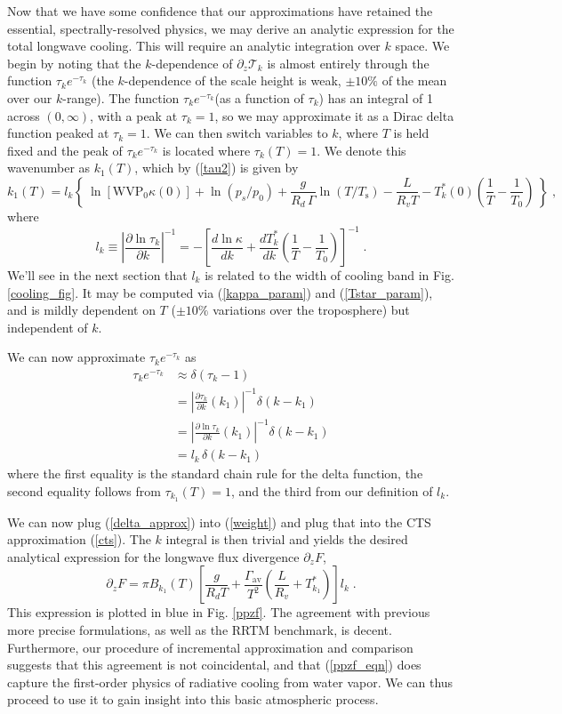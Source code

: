 \documentclass[10pt]{article}
\newcommand{\beqn}{\begin{equation}}
\newcommand{\eeqn}{\end{equation}}
\newcommand{\eqnref}[1]{(\ref{#1})}
\newcommand{\n}{\nonumber}
\newcommand{\inverse}{^{-1}}
\newcommand{\partialderf}[2]{\ensuremath{\frac{\partial #1}{\partial #2}}}
\newcommand{\der}[2]{\ensuremath{\frac{d #1}{d #2}}}
\newcommand{\ppz}{\ensuremath{\partial_z}}
\newcommand{\FLW}{\ensuremath{F}}
\newcommand{\trans}{\ensuremath{\mathcal{T}}}
\newcommand{\Ts}{\ensuremath{T_\mathrm{s}}}
\newcommand{\ps}{\ensuremath{p_s}}
\newcommand{\WVP}{\ensuremath{\mathrm{WVP}}}
\newcommand{\gammaav}{\ensuremath{\Gamma_\mathrm{av}}}
\begin{document}
Now that we have some confidence that our approximations have retained the essential, spectrally-resolved physics,  we may derive an analytic expression for the total longwave cooling. This will require an analytic integration over $k$ space. We begin by noting that the $k$-dependence of $\ppz \trans_k$ is almost entirely through the function $\tau_k e^{-\tau_k}$ (the $k$-dependence of the scale height is weak, $\pm 10 \%$ of the mean over our $k$-range).  The function $\tau_k e^{-\tau_k}$(as a function of $\tau_k$) has an integral of 1 across $(0,\infty)$, with a peak at $\tau_k=1$, so we may approximate it as a Dirac delta function peaked at $\tau_k=1$. We can then switch variables to $k$, where $T$ is held fixed and the peak of $\tau_k e^{-\tau_k}$ is located where	$\tau_{k}(T)=1$. We denote this wavenumber as $k_1(T)$, which by  \eqnref{tau2} is given by 
	\beqn
		k_1(T) =  l_k\left\{\ \ln[ \WVP_0\kappa(0)] + \ln(\ps/p_0) + \frac{g}{R_d\,\Gamma}\ln(T/\Ts) - 
				\frac{L}{R_vT} - T_k^*(0)\left(\frac{1}{T}-\frac{1}{T_0}\right)\  \right\} \; ,
	\label{k1}
	\eeqn
	where 
	\beqn
		l_k \equiv  \left|\frac{\partial \ln \tau_k}{\partial k}\right|\inverse= -\left[ \der{\ln \kappa}{k}+\der{T^*_k}{k}\left(\frac{1}{T}-\frac{1}{T_0}\right)\right]^{-1} \; .
	\n
	\eeqn
	We'll see in the next section that $l_k$ is related to the width of cooling band in Fig. \ref{cooling_fig}. It may be computed via \eqnref{kappa_param} and \eqnref{Tstar_param}, and is mildly dependent on $T$ ($\pm 10\%$ variations over the troposphere) but independent of $k$. 
	
	 We can now approximate $\tau_k e^{-\tau_k}$ as 
	\begin{align}
		\tau_k e^{-\tau_k} & \approx \delta(\tau_k- 1)  \n \\
					    & = \left|\partialderf{\tau_k}{k}(k_1)\right|\inverse\delta(k-k_1) \n  \\
					    & =  \left|\partialderf{\ln\tau_k}{k}(k_1)\right|\inverse\delta(k-k_1) \n  \\ 
					    & = l_k\,  \delta(k-k_1) \label{delta_approx}
	\end{align}
where the first equality is the standard chain rule for the delta function, the second equality follows from $\tau_{k_1}(T)=1$, and the third from our definition of  $l_k$.

We can now plug  \eqnref{delta_approx} into \eqnref{weight} and plug that into the  CTS approximation \eqnref{cts}. The $k$ integral is then trivial and yields the desired analytical expression for the longwave flux divergence $\ppz F$, 
	\beqn
		\ppz \FLW = \pi B_{k_1}(T)\left[\frac{g}{R_d T} + \frac{ \gammaav}{ T^2}\left(\frac{L}{R_v} + T_{k_1}^*\right) \right] l_k \; .
	\label{ppzf_eqn}
	\eeqn
This expression is plotted in blue in Fig. \ref{ppzf}. The agreement with previous more precise formulations, as well as the RRTM benchmark, is decent. Furthermore,  our procedure of incremental approximation and comparison suggests that this agreement is not coincidental, and that  \eqnref{ppzf_eqn} does capture the first-order physics of radiative cooling from water vapor. We can thus proceed to use it to gain insight into this basic atmospheric process.
\end{document}
